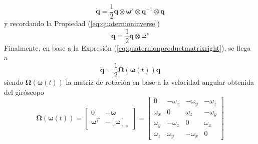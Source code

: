 \begin{equation}
    \dot{\bm{q}} = \frac{1}{2}\bm{q}\otimes\bm{\omega}^s\otimes\bm{q}^{-1}\otimes\bm{q}
\end{equation}
y recordando la Propiedad (\ref{eq:quaternioninverse})
\begin{equation}
    \dot{\bm{q}} = \frac{1}{2}\bm{q}\otimes\bm{\omega}^s 
\end{equation}
Finalmente, en base a la Expresión (\ref{eq:quaternionproductmatrixright}), se llega a
\begin{equation}
    \dot{\bm{q}} = \frac{1}{2}\bm{\Omega}(\bm{\omega}(t))\bm{q}
    \label{eq:edoquaternion}
\end{equation}
siendo $\bm{\Omega}(\bm{\omega}(t))$ la matriz de rotación en base a la velocidad angular obtenida del giróscopo
\begin{equation}
    \bm{\Omega}(\bm{\omega}(t)) =
    \begin{bmatrix}
        0 & -\bm{\omega} \\
        \bm{\omega}^T & -\left[\bm{\omega}\right]_\times
    \end{bmatrix}
    =
    \begin{bmatrix}
        0 & -\omega_x & -\omega_y & -\omega_z \\
        \omega_x & 0 & \omega_z & -\omega_y \\
        \omega_y & -\omega_z & 0 & \omega_x \\
        \omega_z & \omega_y & -\omega_x & 0
    \end{bmatrix}
\end{equation}

